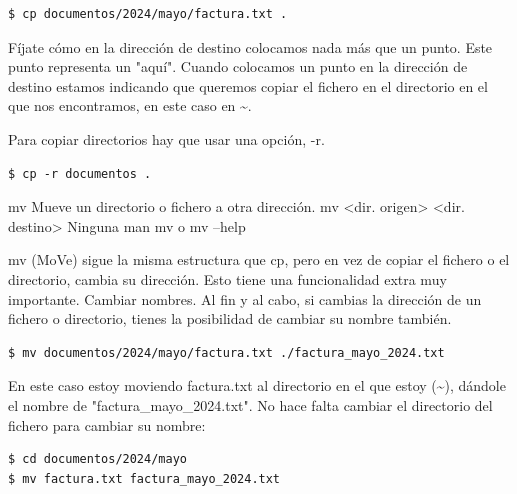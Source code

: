 \begin{tcolorbox-code}
\begin{lstlisting}
$ cp documentos/2024/mayo/factura.txt .
\end{lstlisting}
\end{tcolorbox-code}

Fíjate cómo en la dirección de destino colocamos nada más que un punto. Este punto representa un "aquí". Cuando colocamos un punto en la dirección de destino estamos indicando que queremos copiar el fichero en el directorio en el que nos encontramos, en este caso en \textasciitilde.

Para copiar directorios hay que usar una opción, -r.

\begin{tcolorbox-code}
\begin{lstlisting}
$ cp -r documentos .
\end{lstlisting}
\end{tcolorbox-code}

\begin{command-info}
{mv}
{Mueve un directorio o fichero a otra dirección.}
{mv <dir. origen> <dir. destino>}
{Ninguna}
{man mv o mv --help}
\end{command-info}

mv (MoVe) sigue la misma estructura que cp, pero en vez de copiar el fichero o el directorio, cambia su dirección. Esto tiene una funcionalidad extra muy importante. Cambiar nombres. Al fin y al cabo, si cambias la dirección de un fichero o directorio, tienes la posibilidad de cambiar su nombre también.

\begin{tcolorbox-code}
\begin{lstlisting}
$ mv documentos/2024/mayo/factura.txt ./factura_mayo_2024.txt
\end{lstlisting}
\end{tcolorbox-code}

En este caso estoy moviendo factura.txt al directorio en el que estoy (\textasciitilde), dándole el nombre de "factura\_mayo\_2024.txt". No hace falta cambiar el directorio del fichero para cambiar su nombre:

\begin{tcolorbox-code}
\begin{lstlisting}
$ cd documentos/2024/mayo
$ mv factura.txt factura_mayo_2024.txt
\end{lstlisting}
\end{tcolorbox-code}

